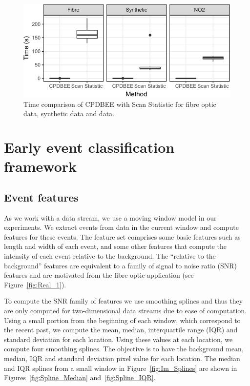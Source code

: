 \documentclass[a4paper,11pt]{article}
\begin{document}
\begin{figure}
	\centering
	\includegraphics{./Graphics/Time_Comparison.pdf}
	\caption{Time comparison of CPDBEE with Scan Statistic for fibre optic data, synthetic data and  data.}
	\label{fig:time_comp}
\end{figure}

\section{Early event classification framework}\label{sec:fts}

\subsection{Event features}\label{sec:Featurelist}

As we work with a data stream, we use a moving window model in our experiments. We extract events from data in the current window and compute features for these events. The feature set comprises some basic features such as length and width of each event, and some other features that compute the intensity of each event relative to the background. The  ``relative to the background'' features are equivalent to a family of signal to noise ratio (SNR) features and are motivated from the fibre optic application (see Figure~\ref{fig:Real_1}).

To compute the SNR family of features  we use smoothing splines and thus they are only computed for two-dimensional data streams due to ease of computation. Using a small portion from the beginning of each window, which correspond to the recent past, we compute the mean, median, interquartile range (IQR) and standard deviation for each location. Using these values at each location, we compute four smoothing splines. The objective is to have the background mean, median, IQR and standard deviation pixel value for each location. The median and IQR splines from a small window in Figure~\ref{fig:Im_Splines} are shown in Figures~\ref{fig:Spline_Median} and~\ref{fig:Spline_IQR}.
\end{document}
